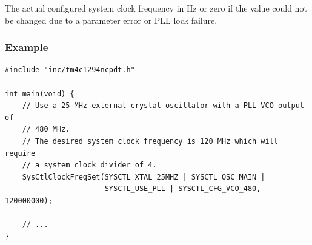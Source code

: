 \documentclass{article}
\begin{document}
The actual configured system clock frequency in Hz or zero if the value
could not be changed due to a parameter error or PLL lock failure.
\subsubsection{Example}
\begin{verbatim}
#include "inc/tm4c1294ncpdt.h"

int main(void) {
    // Use a 25 MHz external crystal oscillator with a PLL VCO output of
    // 480 MHz.
    // The desired system clock frequency is 120 MHz which will require
    // a system clock divider of 4.
    SysCtlClockFreqSet(SYSCTL_XTAL_25MHZ | SYSCTL_OSC_MAIN |
                       SYSCTL_USE_PLL | SYSCTL_CFG_VCO_480, 120000000);

    // ...
}
\end{verbatim}
\end{document}
